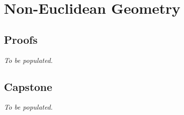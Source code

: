 \chapter{Non-Euclidean Geometry}

\clearpage

\clearpage

\section*{Proofs}
\textit{To be populated.}

\section*{Capstone}
\textit{To be populated.}
